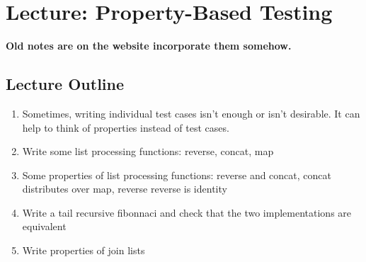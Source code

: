 \startlecture
\chapter{Lecture: Property-Based Testing}


\begin{instructor}

\textbf{Old notes are on the website incorporate them somehow.}

\section*{Lecture Outline}

\begin{enumerate}

\item  Sometimes, writing individual test cases isn't enough or isn't desirable.
It can help to think of properties instead of test cases.

\item Write some list processing functions: reverse, concat, map

\item Some properties of list processing functions: reverse and concat,
concat distributes over map, reverse reverse is identity

\item Write a tail recursive fibonnaci and check that the two implementations
are equivalent

\item Write properties of join lists

\end{enumerate}

\end{instructor}

